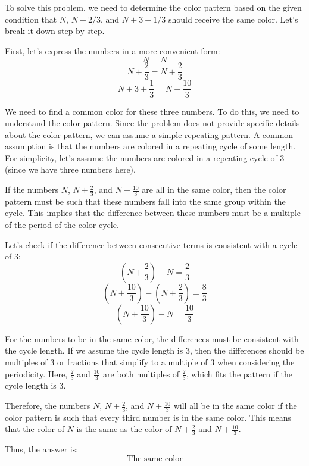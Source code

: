 To solve this problem, we need to determine the color pattern based on the given condition that \(N\), \(N+2/3\), and \(N+3+1/3\) should receive the same color. Let's break it down step by step.

First, let's express the numbers in a more convenient form:
\[ N = N \]
\[ N + \frac{2}{3} = N + \frac{2}{3} \]
\[ N + 3 + \frac{1}{3} = N + \frac{10}{3} \]

We need to find a common color for these three numbers. To do this, we need to understand the color pattern. Since the problem does not provide specific details about the color pattern, we can assume a simple repeating pattern. A common assumption is that the numbers are colored in a repeating cycle of some length. For simplicity, let's assume the numbers are colored in a repeating cycle of 3 (since we have three numbers here).

If the numbers \(N\), \(N + \frac{2}{3}\), and \(N + \frac{10}{3}\) are all in the same color, then the color pattern must be such that these numbers fall into the same group within the cycle. This implies that the difference between these numbers must be a multiple of the period of the color cycle.

Let's check if the difference between consecutive terms is consistent with a cycle of 3:
\[ \left(N + \frac{2}{3}\right) - N = \frac{2}{3} \]
\[ \left(N + \frac{10}{3}\right) - \left(N + \frac{2}{3}\right) = \frac{8}{3} \]
\[ \left(N + \frac{10}{3}\right) - N = \frac{10}{3} \]

For the numbers to be in the same color, the differences must be consistent with the cycle length. If we assume the cycle length is 3, then the differences should be multiples of 3 or fractions that simplify to a multiple of 3 when considering the periodicity. Here, \(\frac{2}{3}\) and \(\frac{10}{3}\) are both multiples of \(\frac{2}{3}\), which fits the pattern if the cycle length is 3.

Therefore, the numbers \(N\), \(N + \frac{2}{3}\), and \(N + \frac{10}{3}\) will all be in the same color if the color pattern is such that every third number is in the same color. This means that the color of \(N\) is the same as the color of \(N + \frac{2}{3}\) and \(N + \frac{10}{3}\).

Thus, the answer is:
\[
\boxed{\text{The same color}}
\]